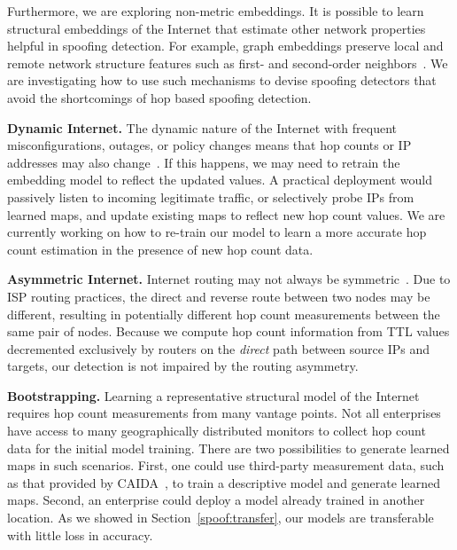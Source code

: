Furthermore, we are exploring non-metric embeddings. It is possible to learn structural embeddings of the Internet that estimate other network properties helpful in spoofing detection. For example, graph embeddings preserve local and remote network structure features such as first- and second-order neighbors~\citep{net-emb}. We are investigating how to use such mechanisms to devise spoofing detectors that avoid the shortcomings of hop based spoofing detection.

{\bf Dynamic Internet.}
The dynamic nature of the Internet with frequent misconfigurations, outages, or policy changes means that hop counts or IP addresses may also change~\citep{cunha, reasons}. If this happens, we may need to retrain the embedding model to reflect the updated values. A practical deployment would passively listen to incoming legitimate traffic, or selectively probe IPs from learned maps, and update existing maps to reflect new hop count values. We are currently working on how to re-train our model to learn a more accurate hop count estimation in the presence of new hop count data.

{\bf Asymmetric Internet.}
Internet routing may not always be symmetric~\citep{asym}. Due to ISP routing practices, the direct and reverse route between two nodes may be different, resulting in potentially different hop count measurements between the same pair of nodes. Because we compute hop count information from TTL values decremented exclusively by routers on the {\em direct} path between source IPs and targets, our detection is not impaired by the routing asymmetry.

{\bf Bootstrapping.} Learning a representative structural model of the Internet requires hop count measurements from many vantage points. Not all enterprises have access to many geographically distributed monitors to collect hop count data for the initial model training. There are two possibilities to generate learned maps in such scenarios. First, one could use third-party measurement data, such as that provided by CAIDA~\citep{ark}, to train a descriptive model and generate learned maps. 
Second, an enterprise could deploy a model already trained in another location. As we showed in Section~\ref{spoof:transfer}, our models are transferable with little loss in accuracy. 


